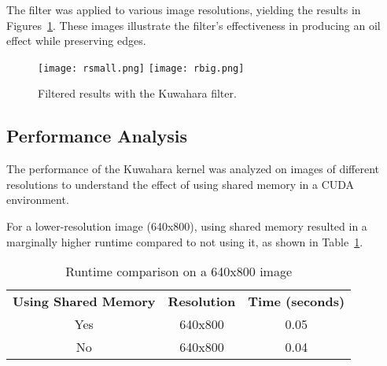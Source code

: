 \documentclass{article}
\begin{document}
    

    The filter was applied to various image resolutions, yielding the results in Figures~\ref{fig:sample_results}. These images illustrate the filter's effectiveness in producing an oil effect while preserving edges.
    
    \begin{figure}[H]
        \centering
        \texttt{[image: rsmall.png]}
        \texttt{[image: rbig.png]}
        \caption{Filtered results with the Kuwahara filter.}
        \label{fig:sample_results}
    \end{figure}

    \subsection{Performance Analysis}
    The performance of the Kuwahara kernel was analyzed on images of different resolutions to understand the effect of using shared memory in a CUDA environment.

    For a lower-resolution image (640x800), using shared memory resulted in a marginally higher runtime compared to not using it, as shown in Table~\ref{tab:result_shared_memory_small}.

    \begin{table}[H]
        \centering
        \begin{tabular}{ccc}
           \textbf{Using Shared Memory} & \textbf{Resolution} & \textbf{Time (seconds)} \\
           Yes & 640x800 & 0.05 \\
           No  & 640x800 & 0.04 \\
        \end{tabular}
        \caption{Runtime comparison on a 640x800 image}
        \label{tab:result_shared_memory_small}
    \end{table}
\end{document}
